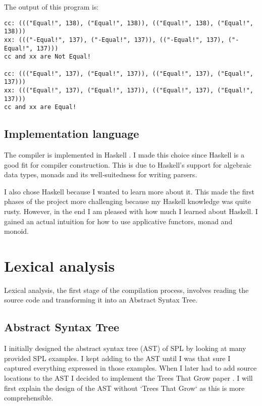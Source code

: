\documentclass{report}
\begin{document}
\noindent The output of this program is: 

\begin{lstlisting}[style=SPL]
cc: ((("Equal!", 138), ("Equal!", 138)), (("Equal!", 138), ("Equal!", 138)))
xx: ((("-Equal!", 137), ("-Equal!", 137)), (("-Equal!", 137), ("-Equal!", 137)))
cc and xx are Not Equal!

cc: ((("Equal!", 137), ("Equal!", 137)), (("Equal!", 137), ("Equal!", 137)))
xx: ((("Equal!", 137), ("Equal!", 137)), (("Equal!", 137), ("Equal!", 137)))
cc and xx are Equal!
\end{lstlisting}

\section{Implementation language}

The compiler is implemented in Haskell \cite{marlow2010haskell}. 
I made this choice since Haskell is a good fit for compiler construction.
This is due to Haskell’s support for algebraic data types, monads and its well‑suitedness for writing parsers.

I also chose Haskell because I wanted to learn more about it. This made the first phases of the project more challenging because my Haskell knowledge was quite rusty. 
However, in the end I am pleased with how much I learned about Haskell. I gained an actual intuition for how to use applicative functors, monad and monoid.


\chapter{Lexical analysis}

Lexical analysis, the first stage of the compilation process, involves reading the source code and transforming it into an Abstract Syntax Tree.

\section{Abstract Syntax Tree}

I initially designed the abstract syntax tree (AST) of SPL by looking at many provided SPL examples. 
I kept adding to the AST until I was that sure I captured everything expressed in those examples.  
When I later had to add source locations to the AST I decided to implement the Trees That Grow paper \cite{Najd2017trees}. I will first explain the design of the AST without `Trees That Grow` as this is more comprehensible.
\end{document}

